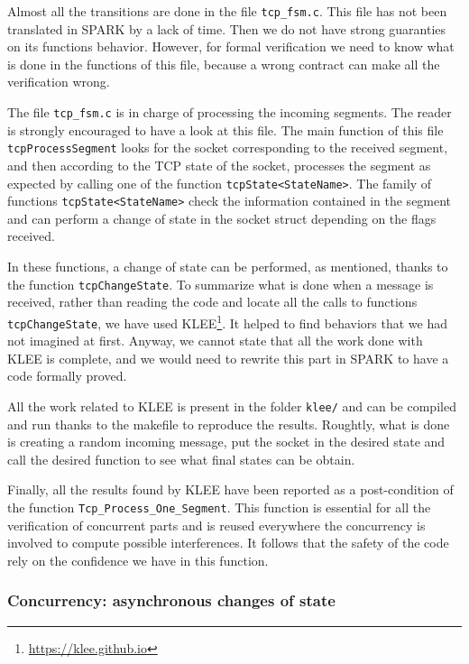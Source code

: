 \documentclass[a4paper, 10pt]{article}
\begin{document}
    Almost all the transitions are done in the file \texttt{tcp\_fsm.c}. This file has not been
    translated in SPARK by a lack of time. Then we do not have strong guaranties on its functions
    behavior. However, for formal verification we need to know what is done in the functions of
    this file, because a wrong contract can make all the verification wrong.

    The file \texttt{tcp\_fsm.c} is in charge of processing the incoming segments. The reader is
    strongly encouraged to have a look at this file. The main function of this file
    \texttt{tcpProcessSegment} looks for the socket corresponding to the received segment, and then
    according to the TCP state of the socket, processes the segment as expected by calling one of
    the function \texttt{tcpState<StateName>}. The family of functions \texttt{tcpState<StateName>}
    check the information contained in the segment and can perform a change of state in the socket
    struct depending on the flags received.

    In these functions, a change of state can be performed, as mentioned, thanks to the function
    \texttt{tcpChangeState}. To summarize what is done when a message is received, rather than
    reading the code and locate all the calls to functions \texttt{tcpChangeState}, we have used
    KLEE\footnote{\url{https://klee.github.io}}. It helped to find behaviors that we had not 
    imagined at first. Anyway, we cannot state that all the work done with KLEE is complete, and
    we would need to rewrite this part in SPARK to have a code formally proved.

    All the work related to KLEE is present in the folder \texttt{klee/} and can be compiled and run
    thanks to the makefile to reproduce the results. Roughtly, what is done is creating a random
    incoming message, put the socket in the desired state and call the desired function to see what
    final states can be obtain.

    Finally, all the results found by KLEE have been reported as a post-condition of the function \lstinline[language=Ada]{Tcp_Process_One_Segment}.
    This function is essential for all the verification of concurrent parts and is reused everywhere
    the concurrency is involved to compute possible interferences. It follows that the safety of the code rely on the
    confidence we have in this function.

    \subsubsection{Concurrency: asynchronous changes of state}
    \label{section:asynchronous}
\end{document}

